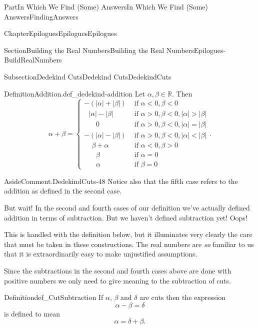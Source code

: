 \documentclass[oneside,10pt,]{book}
\numberwithin{equation}{part}
\newcommand{\abs}[1]{\left|#1\right|}
\newcommand{\RR}{\mathbb {R}}
\newcommand{\lt}{<}
\newcommand{\amp}{&}
\begin{document}
\begin{partptx}{Part}{In Which We Find (Some) Answers}{}{In Which We Find (Some) Answers}{}{}{FindingAnswers}
\begin{chapterptx}{Chapter}{Epilogues}{}{Epilogues}{}{}{Epilogues}
\begin{sectionptx}{Section}{Building the Real Numbers}{}{Building the Real Numbers}{}{}{Epilogues-BuildRealNumbers}
\begin{subsectionptx}{Subsection}{Dedekind Cuts}{}{Dedekind Cuts}{}{}{DedekindCuts}
\begin{definition}{Definition}{Addition.}{def_dedekind-addition}
%
Let \(\alpha, \beta\in\RR\).  Then%
\begin{equation*}
\alpha+\beta= 
\begin{cases}
-(\abs{\alpha}+\abs{\beta}) \amp  \text{ if \(\alpha\lt 0, \beta\lt 0 \) } \\
\ \ \ \abs{\alpha}-\abs{\beta}\amp  \text{ if \(\alpha>0, \beta\lt 0, \abs{\alpha}>\abs{\beta} \)} \\
\ \ \ \ \ \ \ \,0             \amp  \text{ if \(\alpha>0, \beta\lt 0, \abs{\alpha}=\abs{\beta} \)} \\
-(\abs{\alpha}-\abs{\beta})   \amp  \text{ if \(\alpha>0, \beta\lt 0, \abs{\alpha}\lt \abs{\beta} \)} \\
\ \ \ \ \ \beta+\alpha        \amp  \text{ if \(\alpha\lt 0, \beta>0 \) } \\
\ \ \ \ \ \ \ \,\beta{}       \amp  \text{ if \(\alpha=0 \) } \\
\ \ \ \ \ \ \ \,\alpha        \amp  \text{ if \(\beta=0 \) } 
\end{cases} \text{.}
\end{equation*}
%
\end{definition}
\begin{aside}{Aside}{Comment.}{DedekindCuts-48}%
Notice also that the fifth case refers to the addition as defined in the second case.%
\end{aside}
But wait!  In the second and fourth cases of our definition we've actually defined addition in terms of subtraction. But we haven't defined subtraction yet!  Oops!%
\par
This is handled with the definition below, but it illuminates very clearly the care that must be taken in these constructions.  The real numbers are \emph{so} familiar to us that it is extraordinarily easy to make unjustified assumptions.%
\par
Since the subtractions in the second and fourth cases above are done with positive numbers we only need to give meaning to the subtraction of cuts.%
\begin{definition}{Definition}{}{def_CutSubtraction}%
%
If \(\alpha\), \(\beta\) and \(\delta\) are cuts then the expression%
\begin{equation*}
\alpha-\beta=\delta
\end{equation*}
is defined to mean%
\begin{equation*}
\alpha=\delta+\beta\text{.}
\end{equation*}

\end{definition}
\end{subsectionptx}
\end{sectionptx}
\end{chapterptx}
\end{partptx}
\end{document}
